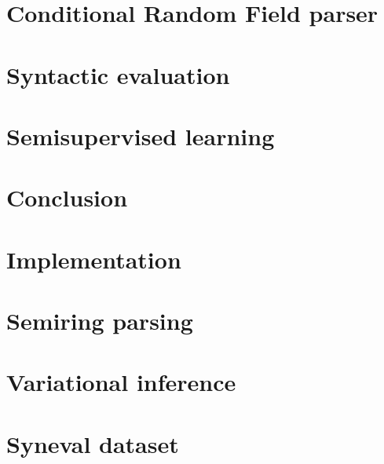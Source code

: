\documentclass{uvamath}
\theoremstyle{remark}
\theoremstyle{definition}
\theoremstyle{definition}
\theoremstyle{definition}
\theoremstyle{definition}
\theoremstyle{definition}
\begin{document}
\chapter{Conditional Random Field parser}
\label{04-crf}



\chapter{Syntactic evaluation}
\label{06-syneval}



\chapter{Semisupervised learning}
\label{05-semisupervised}



\chapter{Conclusion}
\label{07-conclusion}



\appendix

\chapter{Implementation}
\label{A2-implementation}



\chapter{Semiring parsing}
\label{A3-crf}



\chapter{Variational inference}
\label{A4-vi}



\chapter{Syneval dataset}
\label{A5-syneval}





\end{document}
